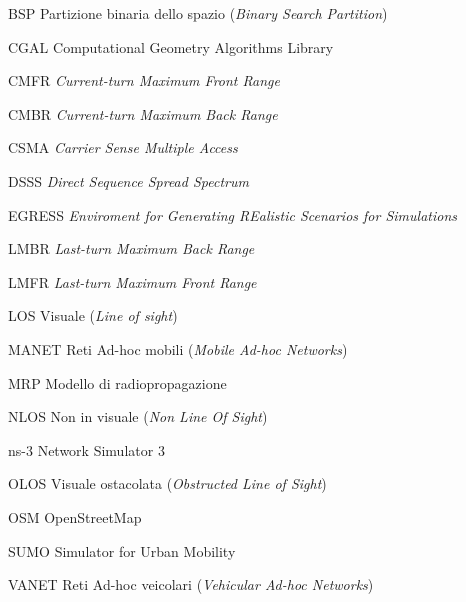 \begin{abbreviations}

\item[BSP] Partizione binaria dello spazio (\textit{Binary Search Partition})
\item[CGAL] Computational Geometry Algorithms Library
\item[CMFR] \textit{Current-turn Maximum Front Range}
\item[CMBR] \textit{Current-turn Maximum Back Range}
\item[CSMA] \textit{Carrier Sense Multiple Access}
\item[DSSS] \textit{Direct Sequence Spread Spectrum}
\item[EGRESS] \textit{Enviroment for Generating REalistic Scenarios for Simulations}
\item[LMBR] \textit{Last-turn Maximum Back Range}
\item[LMFR] \textit{Last-turn Maximum Front Range}
\item[LOS] Visuale (\textit{Line of sight})
\item[MANET] Reti Ad-hoc mobili (\textit{Mobile Ad-hoc Networks})
\item[MRP] Modello di radiopropagazione
\item[NLOS] Non in visuale (\textit{Non Line Of Sight})
\item[ns-3] Network Simulator 3
\item[OLOS] Visuale ostacolata (\textit{Obstructed Line of Sight})
\item[OSM] OpenStreetMap
\item[SUMO] Simulator for Urban Mobility
\item[VANET] Reti Ad-hoc veicolari (\textit{Vehicular Ad-hoc Networks})

\end{abbreviations}
